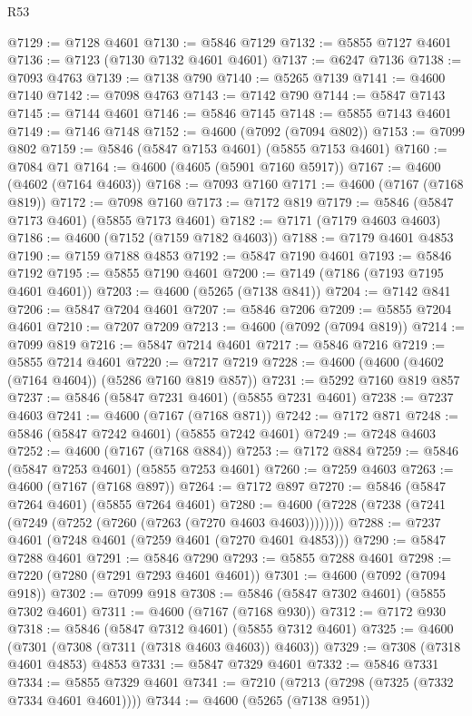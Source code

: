 \begin{lexlean}{R53}
\begin{coremodule}
@7129 := @7128 @4601
@7130 := @5846 @7129
@7132 := @5855 @7127 @4601
@7136 := @7123 (@7130 @7132 @4601 @4601)
@7137 := @6247 @7136
@7138 := @7093 @4763
@7139 := @7138 @790
@7140 := @5265 @7139
@7141 := @4600 @7140
@7142 := @7098 @4763
@7143 := @7142 @790
@7144 := @5847 @7143
@7145 := @7144 @4601
@7146 := @5846 @7145
@7148 := @5855 @7143 @4601
@7149 := @7146 @7148
@7152 := @4600 (@7092 (@7094 @802))
@7153 := @7099 @802
@7159 := @5846 (@5847 @7153 @4601) (@5855 @7153 @4601)
@7160 := @7084 @71
@7164 := @4600 (@4605 (@5901 @7160 @5917))
@7167 := @4600 (@4602 (@7164 @4603))
@7168 := @7093 @7160
@7171 := @4600 (@7167 (@7168 @819))
@7172 := @7098 @7160
@7173 := @7172 @819
@7179 := @5846 (@5847 @7173 @4601) (@5855 @7173 @4601)
@7182 := @7171 (@7179 @4603 @4603)
@7186 := @4600 (@7152 (@7159 @7182 @4603))
@7188 := @7179 @4601 @4853
@7190 := @7159 @7188 @4853
@7192 := @5847 @7190 @4601
@7193 := @5846 @7192
@7195 := @5855 @7190 @4601
@7200 := @7149 (@7186 (@7193 @7195 @4601 @4601))
@7203 := @4600 (@5265 (@7138 @841))
@7204 := @7142 @841
@7206 := @5847 @7204 @4601
@7207 := @5846 @7206
@7209 := @5855 @7204 @4601
@7210 := @7207 @7209
@7213 := @4600 (@7092 (@7094 @819))
@7214 := @7099 @819
@7216 := @5847 @7214 @4601
@7217 := @5846 @7216
@7219 := @5855 @7214 @4601
@7220 := @7217 @7219
@7228 := @4600 (@4600 (@4602 (@7164 @4604)) (@5286 @7160 @819 @857))
@7231 := @5292 @7160 @819 @857
@7237 := @5846 (@5847 @7231 @4601) (@5855 @7231 @4601)
@7238 := @7237 @4603
@7241 := @4600 (@7167 (@7168 @871))
@7242 := @7172 @871
@7248 := @5846 (@5847 @7242 @4601) (@5855 @7242 @4601)
@7249 := @7248 @4603
@7252 := @4600 (@7167 (@7168 @884))
@7253 := @7172 @884
@7259 := @5846 (@5847 @7253 @4601) (@5855 @7253 @4601)
@7260 := @7259 @4603
@7263 := @4600 (@7167 (@7168 @897))
@7264 := @7172 @897
@7270 := @5846 (@5847 @7264 @4601) (@5855 @7264 @4601)
@7280 := @4600 (@7228 (@7238 (@7241 (@7249 (@7252 (@7260 (@7263 (@7270 @4603 @4603))))))))
@7288 := @7237 @4601 (@7248 @4601 (@7259 @4601 (@7270 @4601 @4853)))
@7290 := @5847 @7288 @4601
@7291 := @5846 @7290
@7293 := @5855 @7288 @4601
@7298 := @7220 (@7280 (@7291 @7293 @4601 @4601))
@7301 := @4600 (@7092 (@7094 @918))
@7302 := @7099 @918
@7308 := @5846 (@5847 @7302 @4601) (@5855 @7302 @4601)
@7311 := @4600 (@7167 (@7168 @930))
@7312 := @7172 @930
@7318 := @5846 (@5847 @7312 @4601) (@5855 @7312 @4601)
@7325 := @4600 (@7301 (@7308 (@7311 (@7318 @4603 @4603)) @4603))
@7329 := @7308 (@7318 @4601 @4853) @4853
@7331 := @5847 @7329 @4601
@7332 := @5846 @7331
@7334 := @5855 @7329 @4601
@7341 := @7210 (@7213 (@7298 (@7325 (@7332 @7334 @4601 @4601))))
@7344 := @4600 (@5265 (@7138 @951))

\end{coremodule}
\end{lexlean}
